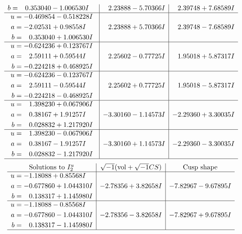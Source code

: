\documentclass[1p]{elsarticle_modified}
\theoremstyle{definition}
\newcommand{\I}{\sqrt{-1}}
\begin{document}
$$\begin{array}{c|c|c}
\begin{aligned}
b &= \phantom{-}0.353040 - 1.006530 I\end{aligned}
 & \phantom{-}2.23888 - 5.70366 I & \phantom{-}2.39748 + 7.68589 I \\ \hline\begin{aligned}
u &= -0.469854 - 0.518228 I \\
a &= -2.02531 + 0.98558 I \\
b &= \phantom{-}0.353040 + 1.006530 I\end{aligned}
 & \phantom{-}2.23888 + 5.70366 I & \phantom{-}2.39748 - 7.68589 I \\ \hline\begin{aligned}
u &= -0.624236 + 0.123767 I \\
a &= \phantom{-}2.59111 + 0.59544 I \\
b &= -0.224218 + 0.468925 I\end{aligned}
 & \phantom{-}2.25602 - 0.77725 I & \phantom{-}1.95018 + 5.87317 I \\ \hline\begin{aligned}
u &= -0.624236 - 0.123767 I \\
a &= \phantom{-}2.59111 - 0.59544 I \\
b &= -0.224218 - 0.468925 I\end{aligned}
 & \phantom{-}2.25602 + 0.77725 I & \phantom{-}1.95018 - 5.87317 I \\ \hline\begin{aligned}
u &= \phantom{-}1.398230 + 0.067906 I \\
a &= \phantom{-}0.38167 + 1.91257 I \\
b &= \phantom{-}0.028832 + 1.217920 I\end{aligned}
 & -3.30160 - 1.14573 I & -2.29360 + 3.30035 I \\ \hline\begin{aligned}
u &= \phantom{-}1.398230 - 0.067906 I \\
a &= \phantom{-}0.38167 - 1.91257 I \\
b &= \phantom{-}0.028832 - 1.217920 I\end{aligned}
 & -3.30160 + 1.14573 I & -2.29360 - 3.30035 I\\
 \hline 
 \end{array}$$\newpage$$\begin{array}{c|c|c}  
\text{Solutions to }I^u_{2}& \I (\text{vol} + \sqrt{-1}CS) & \text{Cusp shape}\\
 \hline 
\begin{aligned}
u &= -1.18088 + 0.85568 I \\
a &= -0.677860 + 1.044310 I \\
b &= \phantom{-}0.138317 + 1.145980 I\end{aligned}
 & -2.78356 + 3.82658 I & -7.82967 - 9.67895 I \\ \hline\begin{aligned}
u &= -1.18088 - 0.85568 I \\
a &= -0.677860 - 1.044310 I \\
b &= \phantom{-}0.138317 - 1.145980 I\end{aligned}
 & -2.78356 - 3.82658 I & -7.82967 + 9.67895 I\\
 \hline 
 \end{array}$$\newpage
\end{document}
